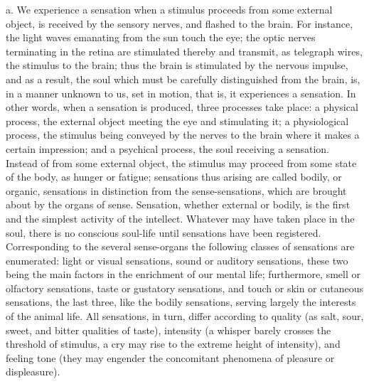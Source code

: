 a. We experience a sensation when a stimulus proceeds from some external object, is received by the sensory nerves, and flashed to the brain. For instance, the light waves emanating from the sun touch the eye; the optic nerves terminating in the retina are stimulated thereby and transmit, as telegraph wires, the stimulus to the brain; thus the brain is stimulated by the nervous impulse, and as a result, the soul which must be carefully distinguished from the brain, is, in a manner unknown to us, set in motion, that is, it experiences a sensation. In other words, when a sensation is produced, three processes take place: a physical process, the external object meeting the eye and stimulating it; a physiological process, the stimulus being conveyed by the nerves to the brain where it makes a certain impression; and a psychical process, the soul receiving a sensation. Instead of from some external object, the stimulus may proceed from some state of the body, as hunger or fatigue; sensations thus arising are called bodily, or organic, sensations in distinction from the sense-sensations, which are brought about by the organs of sense. Sensation, whether external or bodily, is the first and the simplest activity of the intellect. Whatever may have taken place in the soul, there is no conscious soul-life until sensations have been registered. Corresponding to the several sense-organs the following classes of sensations are enumerated: light or visual sensations, sound or auditory sensations, these two being the main factors in the enrichment of our mental life; furthermore, smell or olfactory sensations, taste or gustatory sensations, and touch or skin or cutaneous sensations, the last
three, like the bodily sensations, serving largely the interests of the animal life. All sensations, in turn, differ according to quality (as salt, sour, sweet, and bitter qualities of taste), intensity (a whisper barely crosses the threshold of stimulus, a cry may rise to the extreme height of intensity), and feeling tone (they may engender the concomitant phenomena of pleasure or displeasure).

